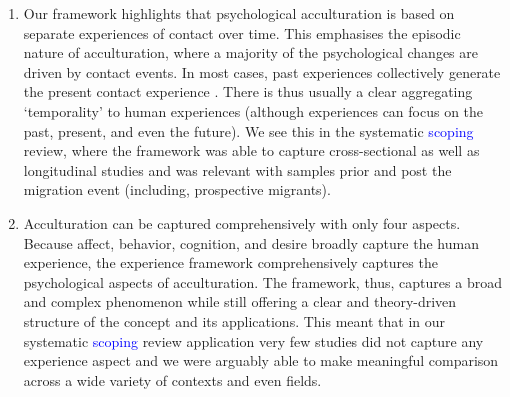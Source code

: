 \documentclass[man, 12pt, a4paper, mask]{apa7}
\begin{document}
\begin{enumerate}
\item Our framework highlights that psychological acculturation is based on separate experiences of contact over time. This emphasises the episodic nature of acculturation, where a majority of the psychological changes are driven by contact events. In most cases, past experiences collectively generate the present contact experience \citep[also see][]{Husserl1959, Heidegger1978}. There is thus usually a clear aggregating `temporality' to human experiences (although experiences can focus on the past, present, and even the future). We see this in the systematic \textcolor{blue}{scoping} review, where the framework was able to capture cross-sectional as well as longitudinal studies and was relevant with samples prior and post the migration event (including, prospective migrants). 

\item Acculturation can be captured comprehensively with only four aspects. Because affect, behavior, cognition, and desire broadly capture the human experience, the experience framework comprehensively captures the psychological aspects of acculturation. The framework, thus, captures a broad and complex phenomenon while still offering a clear and theory-driven structure of the concept and its applications. This meant that in our systematic \textcolor{blue}{scoping} review application very few studies did not capture any experience aspect and we were arguably able to make meaningful comparison across a wide variety of contexts and even fields.


\end{enumerate}
\end{document}
